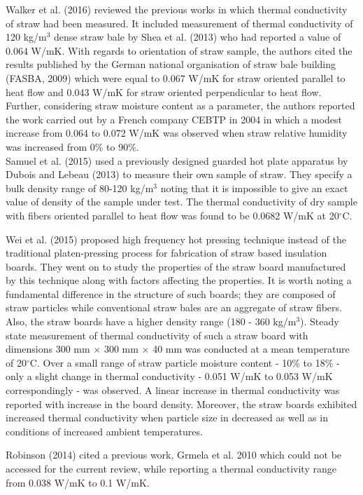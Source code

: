 \documentclass[12pt]{report}
\begin{document}
 Walker et al. (2016) reviewed the previous works in which thermal
conductivity of straw had been measured. It included measurement of
thermal conductivity of 120 kg/m\(^{3}\) dense straw bale by Shea et al.
(2013) who had reported a value of 0.064 W/mK. With regards to
orientation of straw sample, the authors cited the results published by
the German national organisation of straw bale building (FASBA, 2009)
which were equal to 0.067 W/mK for straw oriented parallel to heat flow
and 0.043 W/mK for straw oriented perpendicular to heat flow. Further,
considering straw moisture content as a parameter, the authors reported
the work carried out by a French company CEBTP in 2004 in which a modest
increase from 0.064 to 0.072 W/mK was observed when straw relative
humidity was increased from 0\% to 90\%.\\

 Samuel et al. (2015) used a previously designed guarded hot plate
apparatus by Dubois and Lebeau (2013) to measure their own sample of
straw. They specify a bulk density range of 80-120 kg/m\(^{3}\) noting
that it is impossible to give an exact value of density of the sample
under test. The thermal conductivity of dry sample with fibers oriented
parallel to heat flow was found to be 0.0682 W/mK at 20\(^{\circ}\)C.

 Wei et al. (2015) proposed high frequency hot pressing technique
instead of the traditional platen-pressing process for fabrication of
straw based insulation boards. They went on to study the properties of
the straw board manufactured by this technique along with factors
affecting the properties. It is worth noting a fundamental difference in
the structure of such boards; they are composed of straw particles while
conventional straw bales are an aggregate of straw fibers. Also, the
straw boards have a higher density range (180 - 360 kg/m\(^{3}\)).
Steady state measurement of thermal conductivity of such a straw board
with dimensions 300 mm \(\times\) 300 mm \(\times\) 40 mm was conducted
at a mean temperature of 20\(^{\circ}\)C. Over a small range of straw
particle moisture content - 10\% to 18\% - only a slight change in
thermal conductivity - 0.051 W/mK to 0.053 W/mK correspondingly - was
observed. A linear increase in thermal conductivity was reported with
increase in the board density. Moreover, the straw boards exhibited
increased thermal conductivity when particle size in decreased as well
as in conditions of increased ambient temperatures.

 Robinson (2014) cited a previous work, Grmela et al. 2010 which could
not be accessed for the current review, while reporting a thermal
conductivity range from 0.038 W/mK to 0.1 W/mK.
\end{document}
